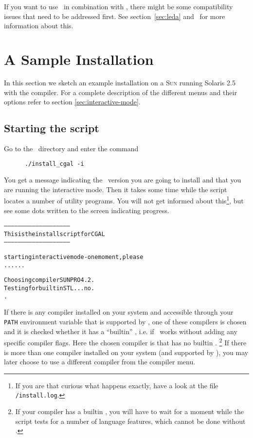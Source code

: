 If you want to use \leda\ in combination with \cgal, there might be
some compatibility issues that need to be addressed first. See
section~\ref{sec:leda} and \compilerpage\ for more information about
this.

\section{A Sample Installation \label{sec:sample-inst}}

In this section we sketch an example installation on a \textsc{Sun}
running Solaris 2.5 with the  compiler. For a complete
description of the different menus and their options refer to section
\ref{sec:interactive-mode}.

\subsection{Starting the script}

Go to the \cgaldir\ directory and enter the command
\begin{verbatim}
      ./install_cgal -i
\end{verbatim}

You get a message indicating the \cgal\ version you are going to
install and that you are running the interactive mode. Then it takes
some time while the script locates a number of utility programs. You
will not get informed about this\footnote{If you are that curious what
  happens exactly, have a look at the file
  \texttt{\cgaldir/install.log}.}, but see some dots written to the
screen indicating progress.

\begin{scriptsize}
\begin{alltt}
--------------------------------------------------------
  This is the install script for CGAL \cgalrelease
--------------------------------------------------------

starting interactive mode - one moment, please
......

  Choosing compiler SUNPRO 4.2.
  Testing for builtin STL ... no.
.
\end{alltt}
\end{scriptsize}
  
If there is any compiler installed on your system and accessible
through your \texttt{PATH} environment variable that is supported by
\cgal, one of these compilers is chosen and it is checked whether it
has a ``builtin'' \stl, i.e. if \stl\ works without adding any
specific compiler flags.  Here the chosen compiler is 
that has no builtin \stl.  \footnote{If your compiler has a builtin
  \stl, you will have to wait for a moment while the script tests for
  a number of language features, which cannot be done without \stl.}
If there is more than one compiler installed on your system (and
supported by \cgal), you may later choose to use a different compiler
from the compiler menu.

